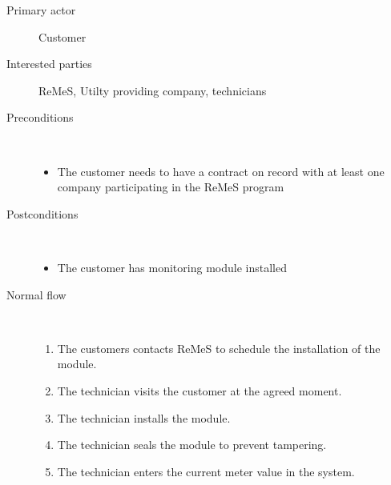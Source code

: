 \begin{description}
	\item[Primary actor] Customer
	\item[Interested parties] ReMeS, Utilty providing company, technicians
	\item[Preconditions] \ 
	\begin{itemize}
		\item The customer needs to have a contract on record with at least one
		company participating in the ReMeS program
	\end{itemize}
	\item[Postconditions] \ 
	\begin{itemize}
		\item The customer has monitoring module installed
	\end{itemize}
	\item[Normal flow] \ 
	\begin{enumerate}
		\item The customers contacts ReMeS to schedule the installation of the module.
		\item The technician visits the customer at the agreed moment.
		\item The technician installs the module.
		\item The technician seals the module to prevent tampering.
		\item The technician enters the current meter value in the system.
	\end{enumerate}
% 		
% 		
\end{description}